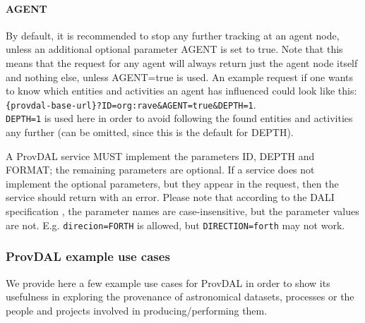 \paragraph{AGENT}
By default, it is recommended to stop any further tracking at an agent node, unless an additional optional parameter AGENT is set to true. Note that this means that the request for any agent will always return just the agent node itself and nothing else, unless AGENT=true is used. An example request if one wants to know which entities and activities an agent has influenced could look like this:\\
\texttt{\{provdal-base-url\}?ID=org:rave\&AGENT=true\&DEPTH=1}.\\
\texttt{DEPTH=1} is used here in order to avoid following the found entities and activities any further (can be omitted, since this is the default for DEPTH).
\newline



A ProvDAL service MUST implement the parameters ID, DEPTH and FORMAT; the remaining parameters are optional.
If a service does not implement the optional parameters, but they appear in the request, then the service should return with an error.
Please note that according to the DALI specification \citep{std:DALI}, the parameter names are case-insensitive, but the parameter values are not. E.g. \texttt{direcion=FORTH} is allowed, but \texttt{DIRECTION=forth} may not work.

\subsubsection{ProvDAL example use cases}
We provide here a few example use cases for ProvDAL in order to show its usefulness in exploring the provenance
of astronomical datasets, processes or the people and projects involved in producing/performing them.

